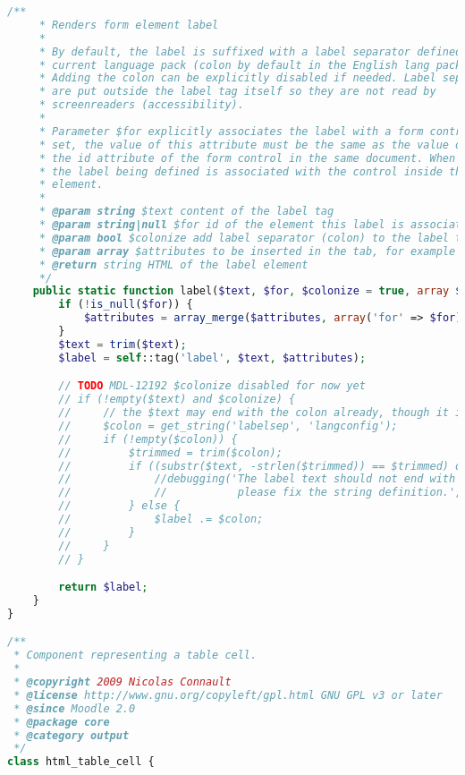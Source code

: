 \begin{lstlisting}[language=PHP]
    /**
     * Renders form element label
     *
     * By default, the label is suffixed with a label separator defined in the
     * current language pack (colon by default in the English lang pack).
     * Adding the colon can be explicitly disabled if needed. Label separators
     * are put outside the label tag itself so they are not read by
     * screenreaders (accessibility).
     *
     * Parameter $for explicitly associates the label with a form control. When
     * set, the value of this attribute must be the same as the value of
     * the id attribute of the form control in the same document. When null,
     * the label being defined is associated with the control inside the label
     * element.
     *
     * @param string $text content of the label tag
     * @param string|null $for id of the element this label is associated with, null for no association
     * @param bool $colonize add label separator (colon) to the label text, if it is not there yet
     * @param array $attributes to be inserted in the tab, for example array('accesskey' => 'a')
     * @return string HTML of the label element
     */
    public static function label($text, $for, $colonize = true, array $attributes=array()) {
        if (!is_null($for)) {
            $attributes = array_merge($attributes, array('for' => $for));
        }
        $text = trim($text);
        $label = self::tag('label', $text, $attributes);

        // TODO MDL-12192 $colonize disabled for now yet
        // if (!empty($text) and $colonize) {
        //     // the $text may end with the colon already, though it is bad string definition style
        //     $colon = get_string('labelsep', 'langconfig');
        //     if (!empty($colon)) {
        //         $trimmed = trim($colon);
        //         if ((substr($text, -strlen($trimmed)) == $trimmed) or (substr($text, -1) == ':')) {
        //             //debugging('The label text should not end with colon or other label separator,
        //             //           please fix the string definition.', DEBUG_DEVELOPER);
        //         } else {
        //             $label .= $colon;
        //         }
        //     }
        // }

        return $label;
    }
}

/**
 * Component representing a table cell.
 *
 * @copyright 2009 Nicolas Connault
 * @license http://www.gnu.org/copyleft/gpl.html GNU GPL v3 or later
 * @since Moodle 2.0
 * @package core
 * @category output
 */
class html_table_cell {


\end{lstlisting}

